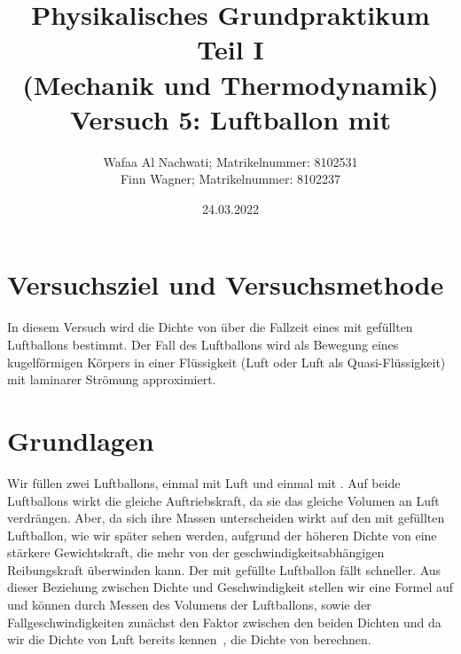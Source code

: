 \documentclass{article}
\date{24.03.2022}
\title{Physikalisches Grundpraktikum Teil I \\ (Mechanik und Thermodynamik) \\ Versuch 5: Luftballon mit \ce{CO2}}
\author{Wafaa Al Nachwati; Matrikelnummer: 8102531 \\ Finn Wagner; Matrikelnummer: 8102237}
\begin{document}
    \maketitle

    \section{Versuchsziel und Versuchsmethode}
      In diesem Versuch wird die Dichte von  über die Fallzeit eines mit  gefüllten Luftballons bestimmt.
      Der Fall des Luftballons wird als Bewegung eines kugelförmigen Körpers in einer Flüssigkeit (Luft oder Luft als Quasi-Flüssigkeit) mit laminarer Strömung approximiert.

    \section{Grundlagen}
      Wir füllen zwei Luftballons, einmal mit Luft und einmal mit . Auf beide Luftballons wirkt die gleiche Auftriebskraft, da sie das gleiche Volumen an Luft verdrängen.
      Aber, da sich ihre Massen unterscheiden wirkt auf den mit  gefüllten Luftballon, wie wir später sehen werden, aufgrund der höheren Dichte von 
      eine stärkere Gewichtskraft, die mehr von der geschwindigkeitsabhängigen Reibungskraft überwinden kann. Der mit  gefüllte Luftballon fällt schneller.
      Aus dieser Beziehung zwischen Dichte und Geschwindigkeit stellen wir eine Formel auf und können durch Messen des Volumens der Luftballons, sowie der Fallgeschwindigkeiten
      zunächst den Faktor zwischen den beiden Dichten und da wir die Dichte von Luft bereits kennen~\cite{Aufgabenstellung}, die Dichte von  berechnen.
\end{document}
